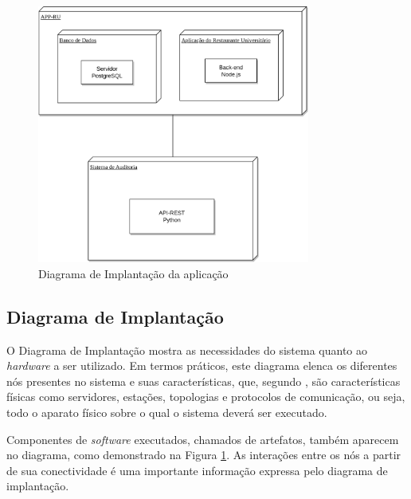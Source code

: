 \newpage
\begin{figure}
    \centering
    \includegraphics[width=0.8\textwidth]{img/Cap3/diagramas/Diagrama de ImplantaÃ§Ã£o.drawio.png}
    \caption{Diagrama de Implantação da aplicação}
    \label{fig:diagrama_implantacao}
\end{figure}
\subsection{Diagrama de Implantação}
O Diagrama de Implantação mostra as necessidades do sistema quanto ao \emph{hardware} a ser utilizado. Em termos práticos, este diagrama elenca os diferentes nós presentes no sistema e suas características, que, segundo \cite{Guedes2018}, são características físicas como servidores, estações, topologias e protocolos de comunicação, ou seja, todo o aparato físico sobre o qual o sistema deverá ser executado.

Componentes de \emph{software} executados, chamados de artefatos, também aparecem no diagrama, como demonstrado na Figura \ref{fig:diagrama_implantacao}. As interações entre os nós a partir de sua conectividade é uma importante informação expressa pelo diagrama de implantação.


\newpage
